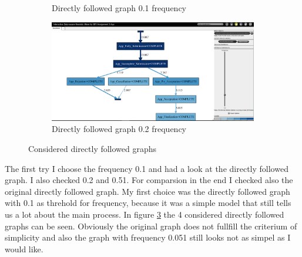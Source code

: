 \begin{figure}[h]
\begin{subfigure}{.49\textwidth}
  \caption{Directly followed graph 0.1 frequency}
  \label{fig:APP_DFG0-1}
\end{subfigure}
\begin{subfigure}{.49\textwidth}
  \centering
  \includegraphics[width=\linewidth]{App_DirectlyFollowedFreq0-2.PNG}
  \caption{Directly followed graph 0.2 frequency}
  \label{fig:APP_DFG0-2}
\end{subfigure}
\caption{Considered directly followed graphs}
\label{fig:App_Direct}
\end{figure}

The first try I choose the frequency 0.1 and had a look at the directly followed graph. I also checked 0.2 and 0.51. For comparsion in the end I checked also the original directly followed graph. My first choice was the directly followed graph with 0.1 as threhold for frequency, because it was a simple model that still tells us a lot about the main process. In figure \ref{fig:App_Direct} the 4 considered directly followed graphs can be seen. Obviously the original graph does not fullfill the criterium of simplicity and also the graph with frequency 0.051 still looks not as simpel as I would like.

